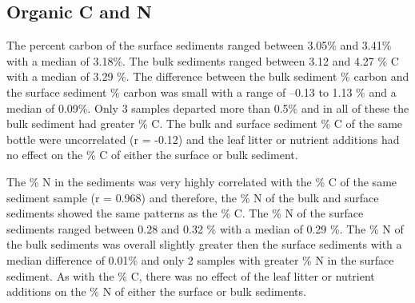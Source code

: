 \subsection{Organic C and N}

The percent carbon of the surface sediments ranged between 3.05\% and 3.41\% with a median of 3.18\%.  The bulk sediments ranged between 3.12 and 4.27 \% C with a median of 3.29 \%.  The difference between the bulk sediment \% carbon and the surface sediment \% carbon was small with a range of --0.13 to 1.13 \% and a median of 0.09\%. Only 3 samples departed more than 0.5\% and in all of these the bulk sediment had greater \% C. The bulk and surface sediment \% C of the same bottle were uncorrelated (r = -0.12) and the leaf litter or nutrient additions had no effect on the \% C of either the surface or bulk sediment.

The \% N in the sediments was very highly correlated with the \% C of the same sediment sample (r = 0.968) and therefore, the \% N of the bulk and surface sediments showed the same patterns as the \% C.  The \% N of the surface sediments ranged between 0.28 and 0.32 \% with a median of 0.29 \%. The \% N of the bulk sediments was overall slightly greater then the surface sediments with a median difference of 0.01\% and only 2 samples with greater \% N in the surface sediment.  As with the \% C, there was no effect of the leaf litter or nutrient additions on the \% N of either the surface or bulk sediments. 
